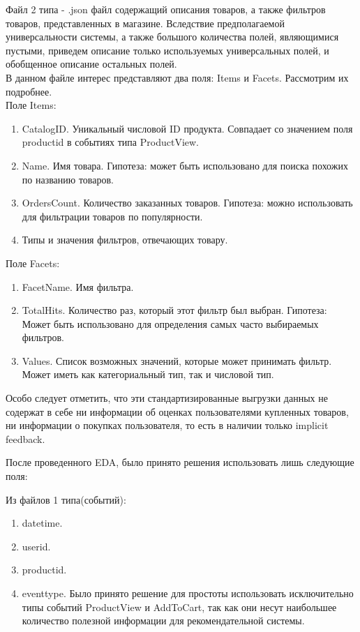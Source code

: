 \documentclass[14pt]{mmcs_article}
\newenvironment{myenumerate}
{ \begin{enumerate}
		\setlength{\itemsep}{0pt}
		\setlength{\parskip}{0pt}
		\setlength{\parsep}{0pt}     }
	{ \end{enumerate}                  }
\begin{document}
Файл 2 типа - .json файл содержащий описания товаров, а также фильтров товаров, представленных в магазине. Вследствие предполагаемой универсальности системы, а также большого количества полей, являющимися пустыми, приведем описание только используемых универсальных полей, и обобщенное описание остальных полей.\\
В данном файле интерес представляют два поля: Items и Facets. Рассмотрим их подробнее. \\
Поле Items:
\begin{myenumerate}
	
	\item CatalogID. Уникальный числовой ID продукта. Совпадает со значением поля productid в событиях типа ProductView.
	\item Name. Имя товара. Гипотеза: может быть использовано для поиска похожих по названию товаров.
 	\item OrdersCount. Количество заказанных товаров. Гипотеза: можно использовать для фильтрации товаров по популярности.
	\item Типы и значения фильтров, отвечающих товару.
\end{myenumerate}

Поле Facets:
\begin{myenumerate}
	
	\item FacetName. Имя фильтра.
	\item TotalHits. Количество раз, который этот фильтр был выбран. Гипотеза: Может быть использовано для определения самых часто выбираемых фильтров.
	\item Values. Список возможных значений, которые может принимать фильтр. Может иметь как категориальный тип, так и числовой тип. 
\end{myenumerate}

Особо следует отметить, что эти стандартизированные выгрузки данных не содержат в себе ни информации об оценках пользователями купленных товаров, ни информации о покупках пользователя, то есть в наличии только implicit feedback.

После проведенного EDA, было принято решения использовать лишь следующие поля:

Из файлов 1 типа(событий):

\begin{myenumerate}
		\item datetime.
		\item userid. 
		\item productid.
		\item eventtype. Было принято решение для простоты использовать исключительно типы событий ProductView и AddToCart, так как они несут наибольшее количество полезной информации для рекомендательной системы. 
\end{myenumerate}
\end{document}
